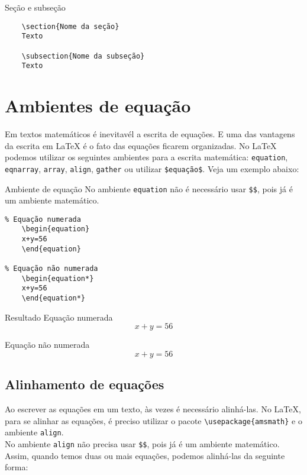 \begin{trailer}{Seção e subseção}
\begin{verbatim}
    \section{Nome da seção}
    Texto
    
    \subsection{Nome da subseção}
    Texto
\end{verbatim}
\end{trailer}
\section{Ambientes de equa\c c\~ao}
Em textos matemáticos é inevitavél a escrita de equações. E uma das vantagens da escrita em \LaTeX{} é o fato das equações ficarem organizadas. No \LaTeX{} podemos utilizar os seguintes ambientes para a escrita matemática: \verb|equation|, \verb|eqnarray|, \verb|array|, \verb|align|, \verb|gather| ou utilizar \verb|$equação$|. Veja um exemplo abaixo:

\begin{trailer}{Ambiente de equação}
No ambiente \verb|equation| não é necessário usar \verb|$$|, pois já é um ambiente matemático.
\begin{verbatim}
% Equação numerada
    \begin{equation} 
    x+y=56
    \end{equation}   
    
% Equação não numerada
    \begin{equation*} 
    x+y=56
    \end{equation*}
\end{verbatim}
\end{trailer}

\begin{trailer}{Resultado}
\noindent Equação numerada
    \begin{equation} 
    x+y=56
    \end{equation}   
    
\noindent Equação não numerada
    \begin{equation*} 
    x+y=56
    \end{equation*} 
\end{trailer}

\subsection{Alinhamento de equa\c c\~oes}
\noindent Ao escrever as equações em um texto, às vezes é necessário alinhá-las. No \LaTeX{}, para se alinhar as equações, é preciso utilizar o pacote \verb|\usepackage{amsmath}| e o ambiente \verb|align|.\\
No ambiente \verb|align| não precisa usar \verb|$$|, pois já é um ambiente matemático. Assim, quando temos duas ou mais equações, podemos alinhá-las da seguinte forma: 

